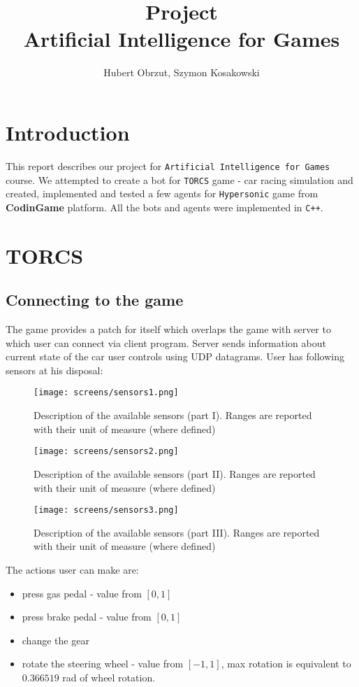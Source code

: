 \documentclass[11pt]{article}
\title{
	Project \\
	Artificial Intelligence for Games \\
}
\author{Hubert Obrzut, Szymon Kosakowski}
\begin{document}
	\maketitle
	
	\section{Introduction}
	This report describes our project for \texttt{Artificial Intelligence for Games} course. We attempted to create a bot for \texttt{TORCS} game - car racing simulation and created, implemented and tested a few agents for \texttt{Hypersonic} game from \textbf{CodinGame} platform. All the bots and agents were implemented in \texttt{C++}.
	
	
	\section{TORCS}
    \subsection{Connecting to the game}
    The game provides a patch for itself which overlaps the game with server to which user can connect via client program. Server sends information about current state of the car user controls using UDP datagrams. User has following sensors at his disposal:
    
    \begin{figure}[H]
 	    \centering
    	\texttt{[image: screens/sensors1.png]}
 	    \caption{Description of the available sensors (part I). Ranges are reported with their unit of measure (where defined)}
 	\end{figure}
 	
    \begin{figure}[H]
 	    \centering
    	\texttt{[image: screens/sensors2.png]}
     	\caption{Description of the available sensors (part II). Ranges are reported with their unit of measure (where defined)}
 	\end{figure}
 	
 	\begin{figure}[H]
 	    \centering
    	\texttt{[image: screens/sensors3.png]}
     	\caption{Description of the available sensors (part III). Ranges are reported with their unit of measure (where defined)}
 	\end{figure}
 	
    The actions user can make are:
    \begin{itemize}
        \item press gas pedal - value from $[0,1]$
        \item press brake pedal - value from $[0,1]$
        \item change the gear
        \item rotate the steering wheel - value from $[-1,1]$, max rotation is equivalent to $0.366519$ rad of wheel rotation.
    \end{itemize}
    
\end{document}
